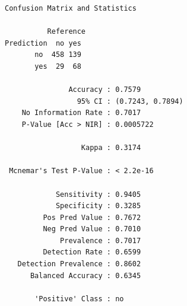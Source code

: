 \documentclass[
  letterpaper,
  DIV=11,
  numbers=noendperiod]{scrreprt}
\newenvironment{Shaded}{\begin{snugshade}}{\end{snugshade}}
\newcommand{\AttributeTok}[1]{\textcolor[rgb]{0.40,0.45,0.13}{#1}}
\newcommand{\FunctionTok}[1]{\textcolor[rgb]{0.28,0.35,0.67}{#1}}
\newcommand{\NormalTok}[1]{\textcolor[rgb]{0.00,0.23,0.31}{#1}}
\newcommand{\OtherTok}[1]{\textcolor[rgb]{0.00,0.23,0.31}{#1}}
\newcommand{\SpecialCharTok}[1]{\textcolor[rgb]{0.37,0.37,0.37}{#1}}
\newcommand{\StringTok}[1]{\textcolor[rgb]{0.13,0.47,0.30}{#1}}
\theoremstyle{definition}
\theoremstyle{remark}
\begin{document}
\begin{verbatim}
Confusion Matrix and Statistics

          Reference
Prediction  no yes
       no  458 139
       yes  29  68
                                          
               Accuracy : 0.7579          
                 95% CI : (0.7243, 0.7894)
    No Information Rate : 0.7017          
    P-Value [Acc > NIR] : 0.0005722       
                                          
                  Kappa : 0.3174          
                                          
 Mcnemar's Test P-Value : < 2.2e-16       
                                          
            Sensitivity : 0.9405          
            Specificity : 0.3285          
         Pos Pred Value : 0.7672          
         Neg Pred Value : 0.7010          
             Prevalence : 0.7017          
         Detection Rate : 0.6599          
   Detection Prevalence : 0.8602          
      Balanced Accuracy : 0.6345          
                                          
       'Positive' Class : no              
                                          
\end{verbatim}

\begin{Shaded}
\end{Shaded}
\end{document}
